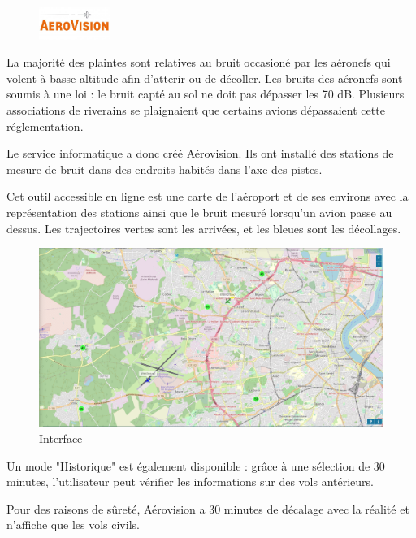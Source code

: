 \begin{figure}[hbt!]
  \centering
  \includegraphics[width=2.3cm]{Images/logo_aerovision.jpg}
  \label{fig:logoaerovision}
\end{figure}

La majorité des plaintes sont relatives au bruit occasioné par les aéronefs qui volent à basse altitude afin d'atterir ou de décoller.
Les bruits des aéronefs sont soumis à une loi : le bruit capté au sol ne doit pas dépasser les 70 dB. Plusieurs associations de riverains se plaignaient que certains avions dépassaient cette réglementation.\newline

Le service informatique a donc créé Aérovision. Ils ont installé des stations de mesure de bruit dans des endroits habités dans l'axe des pistes.

Cet outil accessible en ligne est une carte de l'aéroport et de ses environs avec la représentation des stations ainsi que le bruit mesuré lorsqu'un avion passe au dessus. Les trajectoires vertes sont les arrivées, et les bleues sont les décollages.

\begin{figure}[hbt!]
  \centering
  \includegraphics[width=15.4cm]{Images/aerovision.png}\newline
  \caption{Interface}
  \label{fig:interfaceaerovision}
\end{figure}

\newpage

Un mode "Historique" est également disponible : grâce à une sélection de 30 minutes, l'utilisateur peut vérifier les informations sur des vols antérieurs.

Pour des raisons de sûreté, Aérovision a 30 minutes de décalage avec la réalité et n'affiche que les vols civils.

